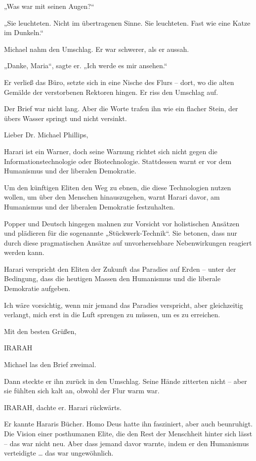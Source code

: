 \documentclass[
]{article}
\begin{document}
„Was war mit seinen Augen?{\kern0pt}``

„Sie leuchteten. Nicht im übertragenen Sinne. Sie leuchteten. Fast wie eine Katze im Dunkeln.``

Michael nahm den Umschlag. Er war schwerer, als er aussah.

„Danke, Maria``, sagte er. „Ich werde es mir ansehen.``

Er verließ das Büro, setzte sich in eine Nische des Flurs -- dort, wo die alten Gemälde der verstorbenen Rektoren hingen. Er riss den Umschlag auf.

Der Brief war nicht lang. Aber die Worte trafen ihn wie ein flacher Stein, der übers Wasser springt und nicht versinkt.

Lieber Dr. Michael Phillips,

Harari ist ein Warner, doch seine Warnung richtet sich nicht gegen die Informationstechnologie oder Biotechnologie. Stattdessen warnt er vor dem Humanismus und der liberalen Demokratie.

Um den künftigen Eliten den Weg zu ebnen, die diese Technologien nutzen wollen, um über den Menschen hinauszugehen, warnt Harari davor, am Humanismus und der liberalen Demokratie festzuhalten.

Popper und Deutsch hingegen mahnen zur Vorsicht vor holistischen Ansätzen und plädieren für die sogenannte „Stückwerk-Technik``. Sie betonen, dass nur durch diese pragmatischen Ansätze auf unvorhersehbare Nebenwirkungen reagiert werden kann.

Harari verspricht den Eliten der Zukunft das Paradies auf Erden -- unter der Bedingung, dass die heutigen Massen den Humanismus und die liberale Demokratie aufgeben.

Ich wäre vorsichtig, wenn mir jemand das Paradies verspricht, aber gleichzeitig verlangt, mich erst in die Luft sprengen zu müssen, um es zu erreichen.

Mit den besten Grüßen,

IRARAH

Michael las den Brief zweimal.

Dann steckte er ihn zurück in den Umschlag. Seine Hände zitterten nicht -- aber sie fühlten sich kalt an, obwohl der Flur warm war.

IRARAH, dachte er. Harari rückwärts.

Er kannte Hararis Bücher. Homo Deus hatte ihn fasziniert, aber auch beunruhigt. Die Vision einer posthumanen Elite, die den Rest der Menschheit hinter sich lässt -- das war nicht neu. Aber dass jemand davor warnte, indem er den Humanismus verteidigte \ldots{} das war ungewöhnlich.
\end{document}
